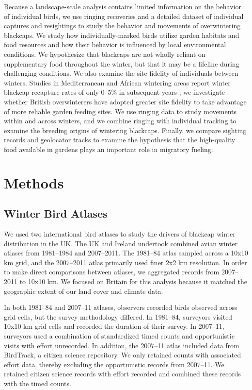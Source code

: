 \documentclass[a4paper, twoside]{templates/ociamthesis}
\begin{document}
Because a landscape-scale analysis contains limited information on the behavior of individual birds, we use ringing recoveries and a detailed dataset of individual captures and resightings to study the behavior and movements of overwintering blackcaps. We study how individually-marked birds utilize garden habitats and food resources and how their behavior is influenced by local environmental conditions. We hypothesize that blackcaps are not wholly reliant on supplementary food throughout the winter, but that it may be a lifeline during challenging conditions. We also examine the site fidelity of individuals between winters. Studies in Mediterranean and African wintering areas report winter blackcap recapture rates of only 0--5\% in subsequent years \autocite{cuadradoAllBlackcapsSylvia1995,cuadradoYearYearRecurrence1992,kingSiteFidelityRecurrence2001,loveiMigrationWinteringBlackcap1985}; we investigate whether British overwinterers have adopted greater site fidelity to take advantage of more reliable garden feeding sites. We use ringing data to study movements within and across winters, and we combine ringing with individual tracking to examine the breeding origins of wintering blackcaps. Finally, we compare sighting records and geolocator tracks to examine the hypothesis that the high-quality food available in gardens plays an important role in migratory fueling.

\hypertarget{methods-1}{%
\section{Methods}\label{methods-1}}

\hypertarget{winter-bird-atlases}{%
\subsection{Winter Bird Atlases}\label{winter-bird-atlases}}

We used two international bird atlases to study the drivers of blackcap winter distribution in the UK. The UK and Ireland undertook combined avian winter atlases from 1981--1984 and 2007--2011. The 1981--84 atlas sampled across a 10x10 km grid, and the 2007--2011 atlas primarily used finer 2x2 km resolution. In order to make direct comparisons between atlases, we aggregated records from 2007--2011 to 10x10 km. We focused on Britain for this analysis because it matched the geographic extent of our land cover and climate data.

In both 1981--84 and 2007--11 atlases, observers recorded birds observed across grid cells, but the survey methodology differed. In 1981--84, surveyors visited 10x10 km grid cells and recorded the duration of their survey. In 2007--11, surveyors used a combination of standardized timed counts and opportunistic visits with effort unrecorded. In addition, the 2007--11 atlas included data from BirdTrack, a citizen science repository. We only retained counts with associated effort data, thereby excluding the opportunistic records from 2007--11. We retained citizen science records with effort recorded and combined these records with the timed counts.
\end{document}
